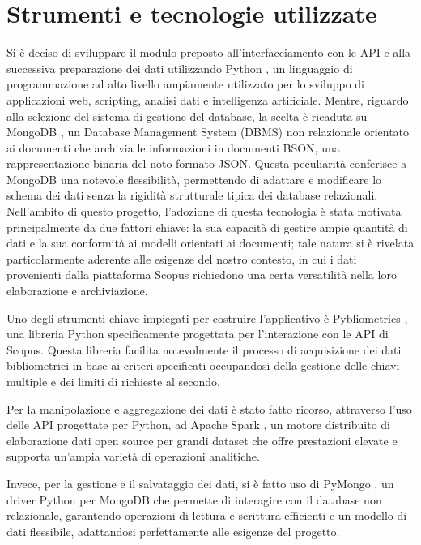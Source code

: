\section{Strumenti e tecnologie utilizzate}\label{scopusBulkDownloader-tech}
Si è deciso di sviluppare il modulo preposto all'interfacciamento con le API e alla successiva preparazione dei dati utilizzando Python \cite{python}, un linguaggio di programmazione ad alto livello ampiamente utilizzato per lo sviluppo di applicazioni web, scripting, analisi dati e intelligenza artificiale.
Mentre, riguardo alla selezione del sistema di gestione del database, la scelta è ricaduta su MongoDB \cite{mongodb-github}, un Database Management System (DBMS) non relazionale orientato ai documenti che archivia le informazioni in documenti BSON, una rappresentazione binaria del noto formato JSON. Questa peculiarità conferisce a MongoDB una notevole flessibilità, permettendo di adattare e modificare lo schema dei dati senza la rigidità strutturale tipica dei database relazionali. Nell'ambito di questo progetto, l'adozione di questa tecnologia è stata motivata principalmente da due fattori chiave: la sua capacità di gestire ampie quantità di dati e la sua conformità ai modelli orientati ai documenti; tale natura si è rivelata particolarmente aderente alle esigenze del nostro contesto, in cui i dati provenienti dalla piattaforma Scopus richiedono una certa versatilità nella loro elaborazione e archiviazione.

Uno degli strumenti chiave impiegati per costruire l'applicativo è Pybliometrics \cite{ROSE2019100263, pybliometrics-github}, una libreria Python specificamente progettata per l'interazione con le API di Scopus. Questa libreria facilita notevolmente il processo di acquisizione dei dati bibliometrici in base ai criteri specificati occupandosi della gestione delle chiavi multiple e dei limiti di richieste al secondo.

Per la manipolazione e aggregazione dei dati è stato fatto ricorso, attraverso l'uso delle API progettate per Python, ad Apache Spark \cite{spark-github}, un motore distribuito di elaborazione dati open source per grandi dataset che offre prestazioni elevate e supporta un'ampia varietà di operazioni analitiche.

Invece, per la gestione e il salvataggio dei dati, si è fatto uso di PyMongo \cite{pymongo-github}, un driver Python per MongoDB che permette di interagire con il database non relazionale, garantendo operazioni di lettura e scrittura efficienti e un modello di dati flessibile, adattandosi perfettamente alle esigenze del progetto.

